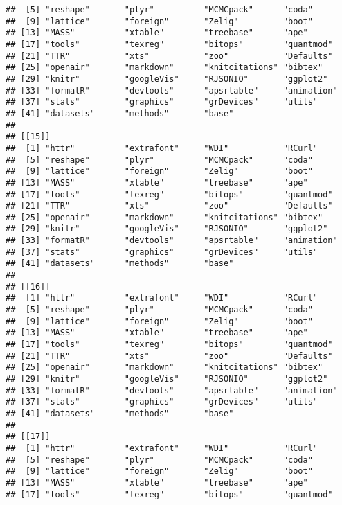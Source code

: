 \begin{knitrout}
\begin{kframe}
\begin{verbatim}
##  [5] "reshape"       "plyr"          "MCMCpack"      "coda"         
##  [9] "lattice"       "foreign"       "Zelig"         "boot"         
## [13] "MASS"          "xtable"        "treebase"      "ape"          
## [17] "tools"         "texreg"        "bitops"        "quantmod"     
## [21] "TTR"           "xts"           "zoo"           "Defaults"     
## [25] "openair"       "markdown"      "knitcitations" "bibtex"       
## [29] "knitr"         "googleVis"     "RJSONIO"       "ggplot2"      
## [33] "formatR"       "devtools"      "apsrtable"     "animation"    
## [37] "stats"         "graphics"      "grDevices"     "utils"        
## [41] "datasets"      "methods"       "base"         
## 
## [[15]]
##  [1] "httr"          "extrafont"     "WDI"           "RCurl"        
##  [5] "reshape"       "plyr"          "MCMCpack"      "coda"         
##  [9] "lattice"       "foreign"       "Zelig"         "boot"         
## [13] "MASS"          "xtable"        "treebase"      "ape"          
## [17] "tools"         "texreg"        "bitops"        "quantmod"     
## [21] "TTR"           "xts"           "zoo"           "Defaults"     
## [25] "openair"       "markdown"      "knitcitations" "bibtex"       
## [29] "knitr"         "googleVis"     "RJSONIO"       "ggplot2"      
## [33] "formatR"       "devtools"      "apsrtable"     "animation"    
## [37] "stats"         "graphics"      "grDevices"     "utils"        
## [41] "datasets"      "methods"       "base"         
## 
## [[16]]
##  [1] "httr"          "extrafont"     "WDI"           "RCurl"        
##  [5] "reshape"       "plyr"          "MCMCpack"      "coda"         
##  [9] "lattice"       "foreign"       "Zelig"         "boot"         
## [13] "MASS"          "xtable"        "treebase"      "ape"          
## [17] "tools"         "texreg"        "bitops"        "quantmod"     
## [21] "TTR"           "xts"           "zoo"           "Defaults"     
## [25] "openair"       "markdown"      "knitcitations" "bibtex"       
## [29] "knitr"         "googleVis"     "RJSONIO"       "ggplot2"      
## [33] "formatR"       "devtools"      "apsrtable"     "animation"    
## [37] "stats"         "graphics"      "grDevices"     "utils"        
## [41] "datasets"      "methods"       "base"         
## 
## [[17]]
##  [1] "httr"          "extrafont"     "WDI"           "RCurl"        
##  [5] "reshape"       "plyr"          "MCMCpack"      "coda"         
##  [9] "lattice"       "foreign"       "Zelig"         "boot"         
## [13] "MASS"          "xtable"        "treebase"      "ape"          
## [17] "tools"         "texreg"        "bitops"        "quantmod"     

\end{verbatim}
\end{kframe}
\end{knitrout}
